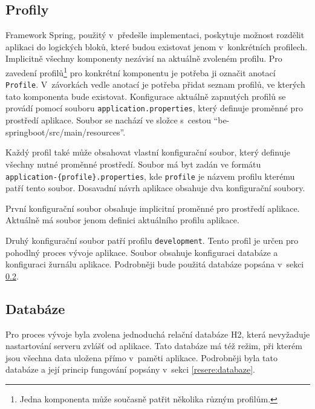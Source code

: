     \subsection{Profily}\label{analyza:soucasnaImplementace:profily}
        Framework Spring, použitý v~předešle implementaci, poskytuje možnost rozdělit aplikaci do logických bloků, které budou existovat jenom v~konkrétních profilech\cite{spring-profile}. Implicitně všechny komponenty nezávisí na aktuálně zvoleném profilu. Pro zavedení profilů\footnote{Jedna komponenta může současně patřit několika různým profilům.} pro konkrétní komponentu je potřeba ji označit anotací \texttt{Profile}. V~závorkách vedle anotací je potřeba přidat seznam profilů, ve kterých tato komponenta bude existovat. Konfigurace aktuálně zapnutých profilů se provádí pomocí souboru \texttt{application.properties}, který definuje proměnné pro prostředí aplikace. Soubor se nachází ve složce s~cestou \enquote{be-springboot/src/main/resources}.
    
        Každý profil také může obsahovat vlastní konfigurační soubor, který definuje všechny nutné proměnné prostředí. Soubor má byt zadán ve formátu \texttt{application-\{profile\}.properties}, kde \texttt{profile} je názvem profilu kterému patří tento soubor. Dosavadní návrh aplikace obsahuje dva konfigurační soubory.
    
        První konfigurační soubor obsahuje implicitní proměnné pro prostředí aplikace. Aktuálně má soubor jenom definici aktuálního profilu aplikace. 
    
        Druhý konfigurační soubor patří profilu \texttt{development}. Tento profil je určen pro pohodlný proces vývoje aplikace. Soubor obsahuje konfiguraci databáze a konfiguraci žurnálu aplikace. Podrobněji bude použitá databáze popsána v~sekci \ref{analyza:soucasnaImplementace:databaze}.
        
    \subsection{Databáze}\label{analyza:soucasnaImplementace:databaze}
        Pro proces vývoje byla zvolena jednoduchá relační databáze H2, která nevyžaduje nastartování serveru zvlášť od aplikace. Tato databáze má též režim, při kterém jsou všechna data uložena přímo v~paměti aplikace. Podrobněji byla tato databáze a její princip fungování popsány v~sekci \ref{resere:databaze}.
    

